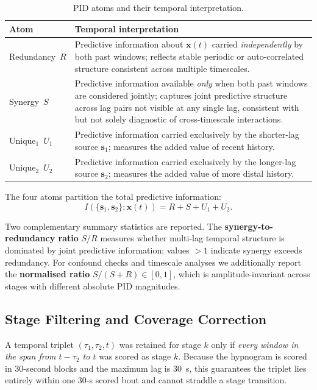 \documentclass[11pt,a4paper]{article}
\begin{document}
\begin{table}[h]
\centering
\caption{PID atoms and their temporal interpretation.}
\label{tab:atoms}
\begin{tabular}{@{}lp{9cm}@{}}
\toprule
\textbf{Atom} & \textbf{Temporal interpretation} \\
\midrule
Redundancy~$R$ & Predictive information about $\mathbf{x}(t)$ carried
  \emph{independently} by both past windows; reflects stable periodic or
  auto-correlated structure consistent across multiple timescales. \\[4pt]
Synergy~$S$ & Predictive information available \emph{only} when both past
  windows are considered jointly; captures joint predictive structure across
  lag pairs not visible at any single lag, consistent with but not solely
  diagnostic of cross-timescale interactions. \\[4pt]
Unique$_1$~$U_1$ & Predictive information carried exclusively by the
  shorter-lag source $\mathbf{s}_1$; measures the added value of recent
  history. \\[4pt]
Unique$_2$~$U_2$ & Predictive information carried exclusively by the
  longer-lag source $\mathbf{s}_2$; measures the added value of more distal
  history. \\
\bottomrule
\end{tabular}
\end{table}

The four atoms partition the total predictive information:
\begin{equation}
  I\!\left(\{\mathbf{s}_1, \mathbf{s}_2\}; \mathbf{x}(t)\right)
  = R + S + U_1 + U_2.
\end{equation}

Two complementary summary statistics are reported.  The
\textbf{synergy-to-redundancy ratio} $S/R$ measures whether multi-lag
temporal structure is dominated by joint predictive information; values
$> 1$ indicate synergy exceeds redundancy.  For confound checks and
timescale analyses we additionally report the \textbf{normalised ratio}
$S/(S + R) \in [0, 1]$, which is amplitude-invariant across stages with
different absolute PID magnitudes.

\subsection{Stage Filtering and Coverage Correction}

A temporal triplet $(\tau_1, \tau_2, t)$ was retained for stage $k$ only if
\emph{every window in the span from $t - \tau_2$ to $t$} was scored as stage
$k$.  Because the hypnogram is scored in 30-second blocks and the maximum
lag is 30~s, this guarantees the triplet lies entirely within one 30-s
scored bout and cannot straddle a stage transition.
\end{document}
